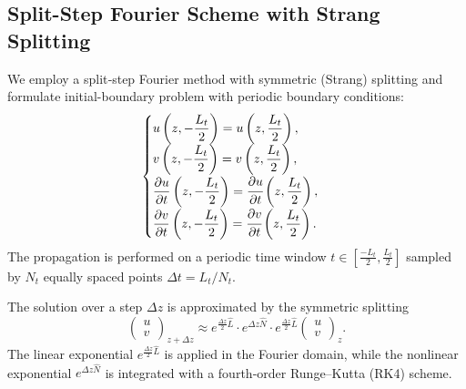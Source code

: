 \documentclass{article}
\begin{document}
    \subsection{Split-Step Fourier Scheme with Strang Splitting}
    We employ a split‑step Fourier method with symmetric (Strang) splitting and formulate initial-boundary problem with periodic boundary conditions:
    \begin{equation} 
        \begin{cases}
            \displaystyle u\left(z, -\frac{L_{t}}{2}\right) = u\left(z, \frac{L_{t}}{2}\right),\\
            \displaystyle v\left(z, -\frac{L_{t}}{2}\right) = v\left(z, \frac{L_{t}}{2}\right),\\
            \displaystyle \frac{\partial u}{\partial t}\left(z, -\frac{L_{t}}{2}\right) = \cfrac{\partial u}{\partial t}\left(z, \frac{L_{t}}{2}\right),\\
            \displaystyle \frac{\partial v}{\partial t}\left(z, -\frac{L_{t}}{2}\right) = \cfrac{\partial v}{\partial t}\left(z, \frac{L_{t}}{2}\right).
        \end{cases}
    \end{equation}
    The propagation is performed on a periodic time window $t\in[\frac{-L_{t}}{2},\frac{L_{t}}{2}]$ sampled by $N_t$ equally spaced points $\Delta t = L_t/N_t$.

    The solution over a step $\Delta z$ is approximated by the symmetric splitting
    \begin{equation}
        \begin{pmatrix} u\\v \end{pmatrix}_{z+\Delta z} \approx
        e^{\frac{\Delta z}{2}\hat L} \cdot
        e^{\Delta z\hat N} \cdot
        e^{\frac{\Delta z}{2}\hat L}
        \begin{pmatrix}u\\v\end{pmatrix}_{z}.
    \end{equation}
    The linear exponential $e^{\frac{\Delta z}{2}\hat L}$ is applied in the Fourier domain,
    while the nonlinear exponential $e^{\Delta z\hat N}$ is integrated with a fourth‑order Runge–Kutta (RK4) scheme.
    
\end{document}

